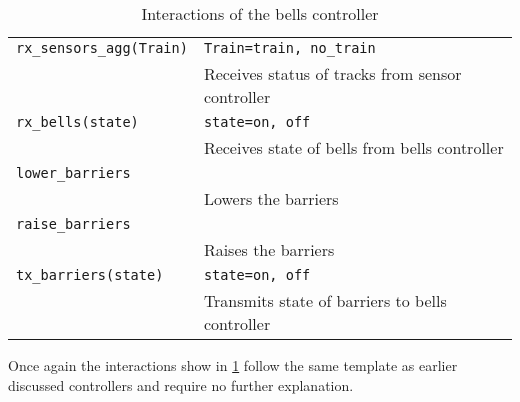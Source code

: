 \documentclass[final]{report}
\begin{document}
\section{}
\begin{table}[H]
\centering
    \begin{tabular}{|l|l|}
    \hline
    \texttt{rx\_sensors\_agg(Train)} & \texttt{Train=train, no\_train}                  \\
                                     & Receives status of tracks from sensor controller \\
    \texttt{rx\_bells(state)}        & \texttt{state=on, off}                           \\
                                     & Receives state of bells from bells controller    \\ \hline
    \texttt{lower\_barriers}         &                                                  \\
                                     & Lowers the barriers                              \\
    \texttt{raise\_barriers}         &                                                  \\
                                     & Raises the barriers                              \\
    \texttt{tx\_barriers(state)}     & \texttt{state=on, off}                           \\
                                     & Transmits state of barriers to bells controller  \\ \hline
    \end{tabular}
\caption{Interactions of the bells controller}
\label{tab:barriersSignals}
\end{table}

Once again the interactions show in \cref{tab:barriersSignals} follow the same template as earlier discussed controllers and require no further explanation.
\end{document}
